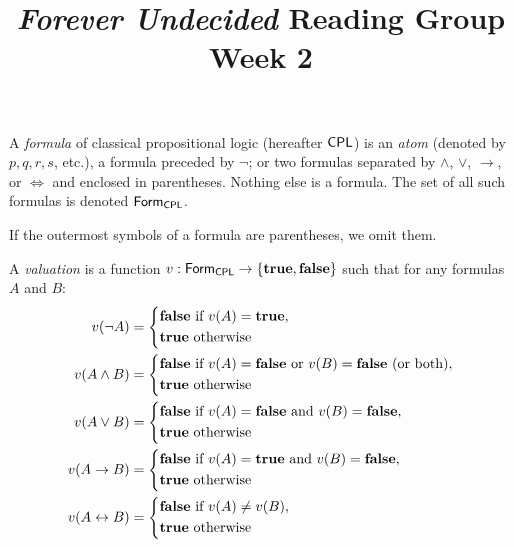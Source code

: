\documentclass{article}
\title{\emph{Forever Undecided} Reading Group \\ Week 2}
\date{}
\author{}
\begin{document}
\maketitle

\begin{definition}
    A \emph{formula} of classical propositional logic (hereafter $\mathsf{CPL}$) is an \emph{atom} (denoted by $p, q, r, s$, etc.), a formula preceded by $\neg$; or two formulas separated by $\wedge$, $\vee$, $\to$, or $\iff$ and enclosed in parentheses. Nothing else is a formula. The set of all such formulas is denoted $\mathsf{Form}_{\mathsf{CPL}}$.
\end{definition}

\begin{notation}
    If the outermost symbols of a formula are parentheses, we omit them.
\end{notation}

\begin{definition}
    A \emph{valuation} is a function $v:\mathsf{Form}_{\mathsf{CPL}} \to \{ \mathbf{true}, \mathbf{false} \}$ such that for any formulas $A$ and $B$:
    \begin{align*}
        v(\neg A) & = \begin{dcases} \mathbf{false} \textrm{ if } v(A) = \mathbf{true}, \\ \mathbf{true} \textrm{ otherwise} \end{dcases} \\
        v(A \wedge B) & = \begin{dcases} \mathbf{false} \textrm{ if } v(A) = \mathbf{false} \textrm{ or } v(B) = \mathbf{false} \textrm{ (or both)}, \\ \mathbf{true} \textrm{ otherwise} \end{dcases} \\
        v(A \vee B) & = \begin{dcases} \mathbf{false} \textrm{ if } v(A) = \mathbf{false} \textrm{ and } v(B) = \mathbf{false}, \\ \mathbf{true} \textrm{ otherwise} \end{dcases} \\
        v(A \to B) & = \begin{dcases} \mathbf{false} \textrm{ if } v(A) = \mathbf{true} \textrm{ and } v(B) = \mathbf{false}, \\ \mathbf{true} \textrm{ otherwise}  \end{dcases} \\
        v(A \leftrightarrow B) & = \begin{dcases} \mathbf{false} \textrm{ if } v(A) \neq v(B), \\ \mathbf{true} \textrm{ otherwise} \end{dcases}
    \end{align*}
\end{definition}
\end{document}
